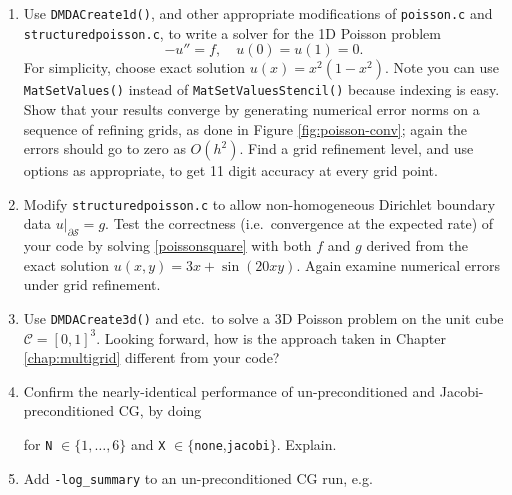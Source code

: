 \renewcommand{\labelenumi}{\arabic{chapter}.\arabic{enumi}\quad}
\begin{enumerate}
\item Use \texttt{DMDACreate1d()}, and other appropriate modifications of \texttt{poisson.c} and \texttt{structuredpoisson.c}, to write a solver for the 1D Poisson problem
    $$-u'' = f, \quad u(0)=u(1)=0.$$
For simplicity, choose exact solution $u(x)=x^2(1-x^2)$.  Note you can use \texttt{MatSetValues()} instead of \texttt{MatSetValuesStencil()} because indexing is easy.  Show that your results converge by generating numerical error norms on a sequence of refining grids, as done in Figure \ref{fig:poisson-conv}; again the errors should go to zero as $O(h^2)$.  Find a grid refinement level, and use \pKSP options as appropriate, to get 11 digit accuracy at every grid point.
\item Modify \texttt{structuredpoisson.c} to allow non-homogeneous Dirichlet boundary data $u|_{\partial \mathcal{S}}=g$.  Test the correctness (i.e.~convergence at the expected rate) of your code by solving \eqref{poissonsquare} with both $f$ and $g$ derived from the exact solution $u(x,y)=3x + \sin(20xy)$.  Again examine  numerical errors under grid refinement.
\item Use \texttt{DMDACreate3d()} and etc.~to solve a 3D Poisson problem on the unit cube $\mathcal{C}=[0,1]^3$.  Looking forward, how is the approach taken in Chapter \ref{chap:multigrid} different from your code?
\item Confirm the nearly-identical performance of un-preconditioned and Jacobi-preconditioned CG, by doing
for \texttt{N} $\in\{1,\dots,6\}$ and \texttt{X} $\in\{$\texttt{none},\texttt{jacobi}$\}$.  Explain.
\item Add \texttt{-log\_summary} to an un-preconditioned CG run, e.g.

\end{enumerate}
